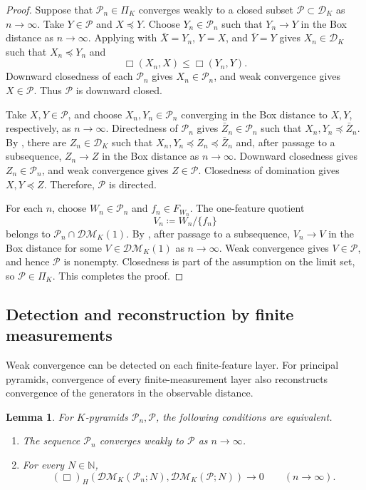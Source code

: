\documentclass[11pt]{amsart}
\theoremstyle{plain}
\newtheorem{lemma}[theorem]{Lemma}
\theoremstyle{definition}
\theoremstyle{remark}
\newcommand{\DK}{\mathcal D_K}
\newcommand{\DM}{\mathcal{DM}}
\begin{document}
\begin{proof}
Suppose that $\mathcal P_n\in\Pi_K$ converges weakly to a closed subset $\mathcal P\subset\DK$ as $n\to\infty$. Take $Y\in\mathcal P$ and $X\preceq Y$. Choose $Y_n\in\mathcal P_n$ such that $Y_n\to Y$ in the Box distance as $n\to\infty$. Applying  with $\bar X=Y_n$, $Y=X$, and $\bar Y=Y$ gives $X_n\in\DK$ such that $X_n\preceq Y_n$ and
\[
\Box(X_n,X)\leq\Box(Y_n,Y).
\]
Downward closedness of each $\mathcal P_n$ gives $X_n\in\mathcal P_n$, and weak convergence gives $X\in\mathcal P$. Thus $\mathcal P$ is downward closed.

Take $X,Y\in\mathcal P$, and choose $X_n,Y_n\in\mathcal P_n$ converging in the Box distance to $X,Y$, respectively, as $n\to\infty$. Directedness of $\mathcal P_n$ gives $\bar Z_n\in\mathcal P_n$ such that $X_n,Y_n\preceq\bar Z_n$. By , there are $Z_n\in\DK$ such that $X_n,Y_n\preceq Z_n\preceq\bar Z_n$ and, after passage to a subsequence, $Z_n\to Z$ in the Box distance as $n\to\infty$. Downward closedness gives $Z_n\in\mathcal P_n$, and weak convergence gives $Z\in\mathcal P$. Closedness of domination \cite[Theorem~4.16]{gds1} gives $X,Y\preceq Z$. Therefore, $\mathcal P$ is directed.

For each $n$, choose $W_n\in\mathcal P_n$ and $f_n\in F_{W_n}$. The one-feature quotient
\[
V_n\coloneqq W_n/\{f_n\}
\]
belongs to $\mathcal P_n\cap\DM_K(1)$. By , after passage to a subsequence, $V_n\to V$ in the Box distance for some $V\in\DM_K(1)$ as $n\to\infty$. Weak convergence gives $V\in\mathcal P$, and hence $\mathcal P$ is nonempty. Closedness is part of the assumption on the limit set, so $\mathcal P\in\Pi_K$. This completes the proof.
\end{proof}

\subsection{Detection and reconstruction by finite measurements}
\label{subsec:pyramid-reconstruction}

Weak convergence can be detected on each finite-feature layer. For principal pyramids, convergence of every finite-measurement layer also reconstructs convergence of the generators in the observable distance.

\begin{lemma}
\label{lem:K-pyramid-measurements}
For $K$-pyramids $\mathcal P_n,\mathcal P$, the following conditions are equivalent.
\begin{enumerate}
\item The sequence $\mathcal P_n$ converges weakly to $\mathcal P$ as $n\to\infty$.
\item For every $N\in\mathbb N$,
\[
(\Box)_H(\DM_K(\mathcal P_n;N),\DM_K(\mathcal P;N))\longrightarrow0\qquad(n\to\infty).
\]
\end{enumerate}
\end{lemma}
\end{document}
